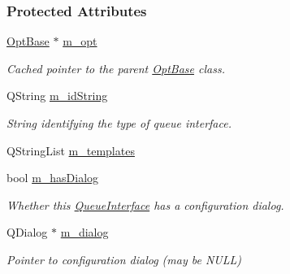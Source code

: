 \subsubsection*{Protected Attributes}
\begin{DoxyCompactItemize}
\item 
\hypertarget{classGlobalSearch_1_1QueueInterface_aadfac830d9d1551ceb3d4c80937c9b9e}{}\hyperlink{classGlobalSearch_1_1OptBase}{Opt\+Base} $\ast$ \hyperlink{classGlobalSearch_1_1QueueInterface_aadfac830d9d1551ceb3d4c80937c9b9e}{m\+\_\+opt}\label{classGlobalSearch_1_1QueueInterface_aadfac830d9d1551ceb3d4c80937c9b9e}

\begin{DoxyCompactList}\small\item\em Cached pointer to the parent \hyperlink{classGlobalSearch_1_1OptBase}{Opt\+Base} class. \end{DoxyCompactList}\item 
\hypertarget{classGlobalSearch_1_1QueueInterface_a695d33f6164f7d83cbe6e0b6d3c5b730}{}Q\+String \hyperlink{classGlobalSearch_1_1QueueInterface_a695d33f6164f7d83cbe6e0b6d3c5b730}{m\+\_\+id\+String}\label{classGlobalSearch_1_1QueueInterface_a695d33f6164f7d83cbe6e0b6d3c5b730}

\begin{DoxyCompactList}\small\item\em String identifying the type of queue interface. \end{DoxyCompactList}\item 
Q\+String\+List \hyperlink{classGlobalSearch_1_1QueueInterface_afbece4079dfba7a2cf11c32153c777a7}{m\+\_\+templates}
\item 
\hypertarget{classGlobalSearch_1_1QueueInterface_a81933da94485f46aec4263172eaf604f}{}bool \hyperlink{classGlobalSearch_1_1QueueInterface_a81933da94485f46aec4263172eaf604f}{m\+\_\+has\+Dialog}\label{classGlobalSearch_1_1QueueInterface_a81933da94485f46aec4263172eaf604f}

\begin{DoxyCompactList}\small\item\em Whether this \hyperlink{classGlobalSearch_1_1QueueInterface}{Queue\+Interface} has a configuration dialog. \end{DoxyCompactList}\item 
\hypertarget{classGlobalSearch_1_1QueueInterface_ae7485212b5aa09c35ec6b1fbfadfeb5d}{}Q\+Dialog $\ast$ \hyperlink{classGlobalSearch_1_1QueueInterface_ae7485212b5aa09c35ec6b1fbfadfeb5d}{m\+\_\+dialog}\label{classGlobalSearch_1_1QueueInterface_ae7485212b5aa09c35ec6b1fbfadfeb5d}

\begin{DoxyCompactList}\small\item\em Pointer to configuration dialog (may be N\+U\+L\+L) \end{DoxyCompactList}\end{DoxyCompactItemize}


